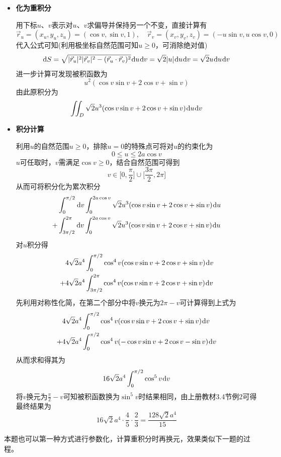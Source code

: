 \documentclass[a4paper,UTF8,fontset=windows,AutoFakeBold]{ctexart}
\newcommand*{\dr}{\hspace{0.07em}\mathrm{d}}
\newcommand*{\rv}{\vec{r}}
\newcommand*{\note}{\noindent *}
\theoremstyle{ex}
\begin{document}
\begin{enumerate}
{\begin{itemize}
            \item \textbf{化为重积分}
            
            用下标$u$、$v$表示对$u$、$v$求偏导并保持另一个不变，直接计算有
            $$\rv_u=(x_u,y_u,z_u)=(\cos v,\sin v,1),\quad\rv_v=(x_v,y_v,z_v)=(-u\sin v,u\cos v,0)$$
            代入公式可知(利用极坐标自然范围可知$u\ge0$，可消除绝对值)
            $$\dr S=\sqrt{|\rv_u|^2|\rv_v|^2-(\rv_u\cdot\rv_v)^2}\dr u\dr v=\sqrt2|u|\dr u\dr v=\sqrt2u\dr u\dr v$$
            进一步计算可发现被积函数为
            $$u^2(\cos v\sin v+2\cos v+\sin v)$$
            由此原积分为
            $$\iint_D\sqrt2u^3(\cos v\sin v+2\cos v+\sin v)\dr u\dr v$$

            \item \textbf{积分计算}
            
            利用$u$的自然范围$u\ge0$，排除$u=0$的特殊点可将对$u$的约束化为
            $$0\le u\le 2a\cos v$$
            $u$可任取时，$v$需满足$\cos v\ge0$，结合自然范围可得到
            $$v\in\bigg[0,\frac{\pi}{2}\bigg]\cup\bigg[\frac{3\pi}{2},2\pi\bigg]$$
            从而可将积分化为累次积分
            $$\begin{aligned}&\int_0^{\pi/2}\dr v\int_0^{2a\cos v}\sqrt2u^3(\cos v\sin v+2\cos v+\sin v)\dr u\\+&\int_{3\pi/2}^{2\pi}\dr v\int_0^{2a\cos v}\sqrt2u^3(\cos v\sin v+2\cos v+\sin v)\dr u\end{aligned}$$
            对$u$积分得
            $$\begin{aligned}&4\sqrt2a^4\int_0^{\pi/2}\cos^4v(\cos v\sin v+2\cos v+\sin v)\dr v\\+&4\sqrt2a^4\int_{3\pi/2}^{2\pi}\cos^4v(\cos v\sin v+2\cos v+\sin v)\dr v\end{aligned}$$
            先利用对称性化简，在第二个部分中将$v$换元为$2\pi-v$可计算得到上式为
            $$\begin{aligned}&4\sqrt2a^4\int_0^{\pi/2}\cos^4v(\cos v\sin v+2\cos v+\sin v)\dr v\\+&4\sqrt2a^4\int_0^{\pi/2}\cos^4v(-\cos v\sin v+2\cos v-\sin v)\dr v\end{aligned}$$
            从而求和得其为
            $$16\sqrt2a^4\int_0^{\pi/2}\cos^5v\dr v$$
            将$v$换元为$\frac{\pi}{2}-v$可知被积函数换为$\sin^5v$时结果相同，由上册教材3.4节例2可得最终结果为
            $$16\sqrt2a^4\cdot\frac{4}{5}\cdot\frac{2}{3}=\frac{128\sqrt2a^4}{15}$$
        \end{itemize}

        \note 本题也可以第一种方式进行参数化，计算重积分时再换元，效果类似下一题的过程。
    }


\end{enumerate}
\end{document}
